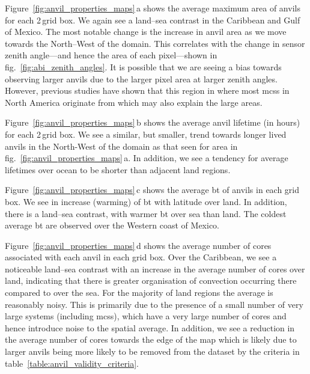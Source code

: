 Figure~\ref{fig:anvil_properties_maps}\,a shows the average maximum area of anvils for each 2\,\textdegree grid box.
We again see a land--sea contrast in the Caribbean and Gulf of Mexico.
The most notable change is the increase in anvil area as we move towards the North--West of the domain.
This correlates with the change in sensor zenith angle---and hence the area of each pixel---shown in fig.~\ref{fig:abi_zenith_angles}.
It is possible that we are seeing a bias towards observing larger anvils due to the larger pixel area at larger zenith angles.
However, previous studies have shown that this region in where most \acrshort{mcs}s in North America originate from \citep{feng_spatiotemporal_2019} which may also explain the large areas.

Figure~\ref{fig:anvil_properties_maps}\,b shows the average anvil lifetime (in hours) for each 2\,\textdegree grid box.
We see a similar, but smaller, trend towards longer lived anvils in the North-West of the domain as that seen for area in fig.~\ref{fig:anvil_properties_maps}\,a.
In addition, we see a tendency for average lifetimes over ocean to be shorter than adjacent land regions.

Figure~\ref{fig:anvil_properties_maps}\,c shows the average \acrshort{bt} of anvils in each grid box.
We see in increase (warming) of \acrshort{bt} with latitude over land.
In addition, there is a land--sea contrast, with warmer \acrshort{bt} over sea than land.
The coldest average \acrshort{bt} are observed over the Western coast of Mexico.

Figure~\ref{fig:anvil_properties_maps}\,d shows the average number of cores associated with each anvil in each grid box.
Over the Caribbean, we see a noticeable land--sea contrast with an increase in the average number of cores over land, indicating that there is greater organisation of convection occurring there compared to over the sea.
For the majority of land regions the average is reasonably noisy.
This is primarily due to the presence of a small number of very large systems (including \acrshort{mcs}s), which have a very large number of cores and hence introduce noise to the spatial average.
In addition, we see a reduction in the average number of cores towards the edge of the map which is likely due to larger anvils being more likely to be removed from the dataset by the criteria in table~\ref{table:anvil_validity_criteria}.





